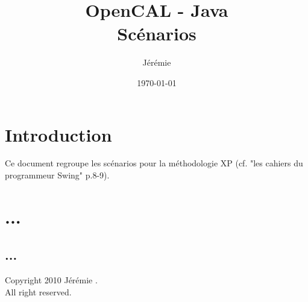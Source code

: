 \documentclass[pdftex,a4paper,11pt]{article}
\begin{document}
\title{OpenCAL - Java\\\medskip
       Scénarios}
\author{Jérémie }
\date{\today}

\maketitle


\section*{Introduction}

Ce document regroupe les scénarios pour la méthodologie XP (cf. "les cahiers du programmeur Swing" p.8-9).

\section{...}
\subsection{...}



\clearpage

\begin{center}
    Copyright \textcopyright{} 2010 Jérémie .\\
    All right reserved.
\end{center}
\end{document}
